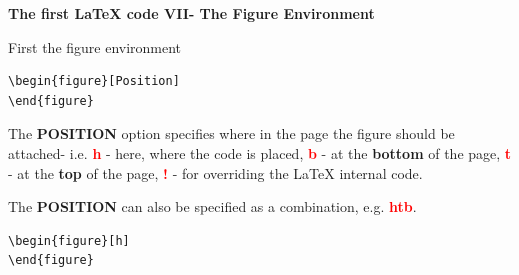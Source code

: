 \documentclass[xcolor=dvipsnames]{beamer}
\begin{document}
\begin{frame}[fragile]{\textbf{The first \LaTeX{} code VII- The Figure Environment}}


\justifying

First the figure environment \\

\vspace{0.1cm}
\begin{center}
\begin{minipage}{6cm}
\color{red}\begin{Verbatim}[frame=single]
\begin{figure}[Position]
\end{figure}
\end{Verbatim}
\end{minipage}
\end{center}

\vspace{0.1cm}
The \textbf{POSITION} option specifies where in the page the figure should be attached- i.e. \textcolor{red}{\textbf{h}} - here, where the code is placed, \textcolor{red}{\textbf{b}} - at the \textbf{bottom} of the page, \textcolor{red}{\textbf{t}} - at the \textbf{top} of the page, \textcolor{red}{\textbf{!}} - for overriding the \LaTeX{} internal code. \\

\vspace{0.3cm}

The \textbf{POSITION} can also be specified as a combination, e.g. \textcolor{red}{\textbf{htb}}.

\vspace{0.3cm}
\begin{center}
\begin{minipage}{6cm}
\color{red}\begin{Verbatim}[frame=single]
\begin{figure}[h]
\end{figure}
\end{Verbatim}
\end{minipage}
\end{center}


\end{frame}
\end{document}
